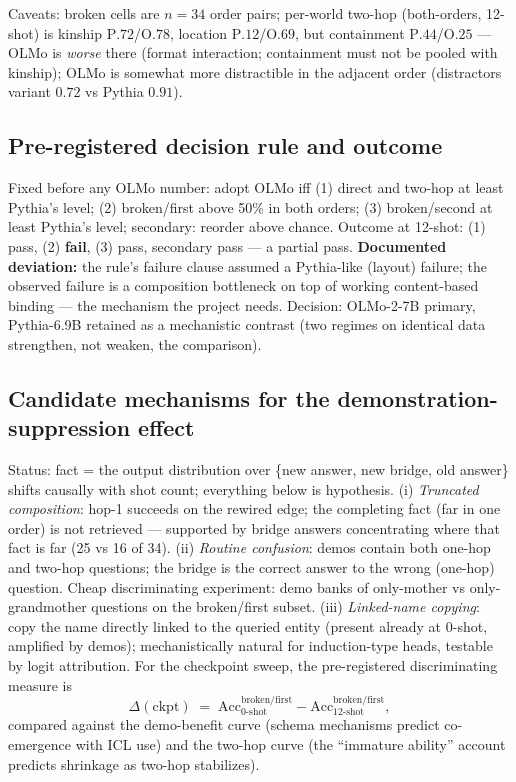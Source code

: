 \documentclass[11pt,a4paper]{article}
\begin{document}
Caveats: broken cells are $n{=}34$ order pairs; per-world two-hop (both-orders, 12-shot) is kinship P$.72$/O$.78$, location P$.12$/O$.69$, but containment P$.44$/O$.25$ --- OLMo is \emph{worse} there (format interaction; containment must not be pooled with kinship); OLMo is somewhat more distractible in the adjacent order (distractors variant $0.72$ vs Pythia $0.91$).

\subsection{Pre-registered decision rule and outcome}
Fixed before any OLMo number: adopt OLMo iff (1) direct and two-hop at least Pythia's level; (2) broken/first above 50\% in both orders; (3) broken/second at least Pythia's level; secondary: reorder above chance. Outcome at 12-shot: (1) pass, (2) \textbf{fail}, (3) pass, secondary pass --- a partial pass. \textbf{Documented deviation:} the rule's failure clause assumed a Pythia-like (layout) failure; the observed failure is a composition bottleneck on top of working content-based binding --- the mechanism the project needs. Decision: OLMo-2-7B primary, Pythia-6.9B retained as a mechanistic contrast (two regimes on identical data strengthen, not weaken, the comparison).

\subsection{Candidate mechanisms for the demonstration-suppression effect}
Status: fact = the output distribution over \{new answer, new bridge, old answer\} shifts causally with shot count; everything below is hypothesis. (i) \emph{Truncated composition}: hop-1 succeeds on the rewired edge; the completing fact (far in one order) is not retrieved --- supported by bridge answers concentrating where that fact is far (25 vs 16 of 34). (ii) \emph{Routine confusion}: demos contain both one-hop and two-hop questions; the bridge is the correct answer to the wrong (one-hop) question. Cheap discriminating experiment: demo banks of only-mother vs only-grandmother questions on the broken/first subset. (iii) \emph{Linked-name copying}: copy the name directly linked to the queried entity (present already at 0-shot, amplified by demos); mechanistically natural for induction-type heads, testable by logit attribution. For the checkpoint sweep, the pre-registered discriminating measure is
\[
\Delta(\text{ckpt}) \;=\; \mathrm{Acc}^{\text{broken/first}}_{\text{0-shot}}-\mathrm{Acc}^{\text{broken/first}}_{\text{12-shot}},
\]
compared against the demo-benefit curve (schema mechanisms predict co-emergence with ICL use) and the two-hop curve (the ``immature ability'' account predicts shrinkage as two-hop stabilizes).
\end{document}
